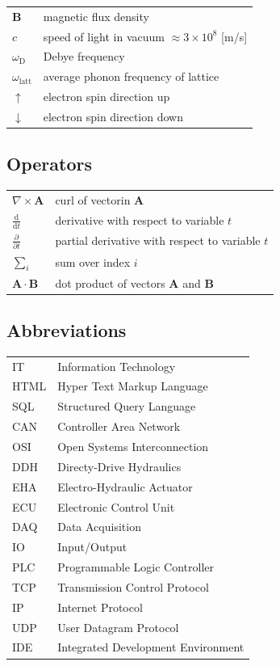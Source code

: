 \documentclass[english,12pt,a4paper,pdftex,eng,utf8]{aaltothesis}
\begin{document}
\begin{tabular}{ll}
$\mathbf{B}$  & magnetic flux density  \\
$c$              & speed of light in vacuum $\approx 3\times10^8$ [m/s]\\
$\omega_{\mathrm{D}}$    & Debye frequency \\
$\omega_{\mathrm{latt}}$ & average phonon frequency of lattice \\
$\uparrow$       & electron spin direction up\\
$\downarrow$     & electron spin direction down
\end{tabular}

\subsection*{Operators}

\begin{tabular}{ll}
$\nabla \times \mathbf{A}$              & curl of vectorin $\mathbf{A}$\\
$\displaystyle\frac{\mbox{d}}{\mbox{d} t}$ & derivative with respect to 
variable $t$\\[3mm]
$\displaystyle\frac{\partial}{\partial t}$  & partial derivative with respect 
to variable $t$ \\[3mm]
$\sum_i $                       & sum over index $i$\\
$\mathbf{A} \cdot \mathbf{B}$    & dot product of vectors $\mathbf{A}$ and 
$\mathbf{B}$
\end{tabular}

\subsection*{Abbreviations}

\begin{tabular}{ll}
  IT & Information Technology \\
  HTML & Hyper Text Markup Language \\
  SQL & Structured Query Language \\
  CAN & Controller Area Network \\
  OSI & Open Systems Interconnection \\
  DDH & Directy-Drive Hydraulics \\
  EHA & Electro-Hydraulic Actuator \\
  ECU & Electronic Control Unit \\
  DAQ & Data Acquisition \\
  IO & Input/Output \\
  PLC & Programmable Logic Controller \\
  TCP & Transmission Control Protocol \\
  IP & Internet Protocol \\
  UDP & User Datagram Protocol \\
  IDE & Integrated Development Environment \\
\end{tabular}
\end{document}
